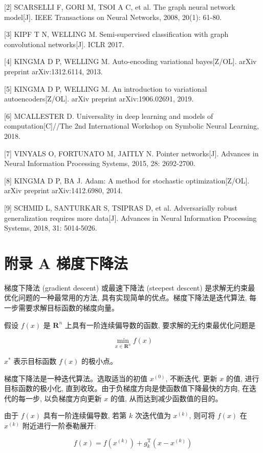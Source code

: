 \documentclass[10pt]{article}
\begin{document}
[2] SCARSELLI F, GORI M, TSOI A C, et al. The graph neural network model[J]. IEEE Transactions on Neural Networks, 2008, 20(1): 61-80.

[3] KIPF T N, WELLING M. Semi-supervised classification with graph convolutional networks[J]. ICLR 2017.

[4] KINGMA D P, WELLING M. Auto-encoding variational bayes[Z/OL]. arXiv preprint arXiv:1312.6114, 2013.

[5] KINGMA D P, WELLING M. An introduction to variational autoencoders[Z/OL]. arXiv preprint arXiv:1906.02691, 2019.

[6] MCALLESTER D. Universality in deep learning and models of computation[C]//The 2nd International Workshop on Symbolic Neural Learning, 2018.

[7] VINYALS O, FORTUNATO M, JAITLY N. Pointer networks[J]. Advances in Neural Information Processing Systems, 2015, 28: 2692-2700.

[8] KINGMA D P, BA J. Adam: A method for stochastic optimization[Z/OL]. arXiv preprint arXiv:1412.6980, 2014.

[9] SCHMID L, SANTURKAR S, TSIPRAS D, et al. Adversarially robust generalization requires more data[J]. Advances in Neural Information Processing Systems, 2018, 31: 5014-5026.

\section*{附录 A 梯度下降法}
梯度下降法 (gradient descent) 或最速下降法 (steepest descent) 是求解无约束最优化问题的一种最常用的方法, 具有实现简单的优点。梯度下降法是迭代算法, 每一步需要求解目标函数的梯度向量。

假设 $f(x)$ 是 $\boldsymbol{R}^{n}$ 上具有一阶连续偏导数的函数, 要求解的无约束最优化问题是


\begin{equation*}
\min _{x \in \boldsymbol{R}^{n}} f(x) \tag{A.1}
\end{equation*}


$x^{*}$ 表示目标函数 $f(x)$ 的极小点。

梯度下降法是一种迭代算法。选取适当的初值 $x^{(0)}$, 不断迭代, 更新 $x$ 的值, 进行目标函数的极小化, 直到收玫。由于负梯度方向是使函数值下降最快的方向, 在迭代的每一步, 以负梯度方向更新 $x$ 的值, 从而达到减少函数值的目的。

由于 $f(x)$ 具有一阶连续偏导数, 若第 $k$ 次迭代值为 $x^{(k)}$, 则可将 $f(x)$ 在 $x^{(k)}$ 附近进行一阶泰勒展开:


\begin{equation*}
f(x)=f\left(x^{(k)}\right)+g_{k}^{\mathrm{T}}\left(x-x^{(k)}\right) \tag{A.2}
\end{equation*}
\end{document}
